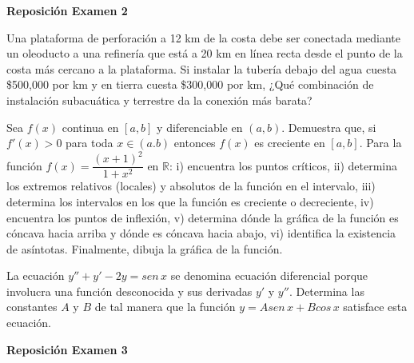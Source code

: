 \documentclass[12pt]{exam}
\begin{document}
\newpage

\begin{center}
\Large 
\textbf{Reposición Examen 2}
\end{center}{}
\normalsize

\begin{questions}
    \question Una plataforma de perforación a 12 km de la costa debe ser conectada mediante un oleoducto a una refinería que está a 20 km en línea recta desde el punto de la costa más cercano a la plataforma. Si instalar la tubería debajo del agua cuesta \$500,000 por km y en tierra cuesta \$300,000 por km, ¿Qué combinación de instalación subacuática y terrestre da la conexión más barata?

\vskip10pt
\question 
Sea $f(x)$ continua en $[a,b]$ y diferenciable en $(a,b)$. Demuestra que, si $f'(x)>0$ para toda $x\in (a.b)$ entonces $f(x)$ es creciente en $[a,b]$.
\vskip10pt
\question Para la función $f(x)=\dfrac{(x+1)^2}{1+x^2}$ en $\mathbb{R}$: i) encuentra los puntos críticos, ii) determina los extremos relativos (locales) y absolutos de la función en el intervalo, iii) determina los intervalos en los que la función es creciente o decreciente, iv) encuentra los puntos de inflexión, v) determina dónde la gráfica de la función es cóncava hacia arriba y dónde es cóncava hacia abajo, vi) identifica la existencia de asíntotas. Finalmente, dibuja la gráfica de la función.

\question La ecuación $y''+y'-2y=sen\,x$ se denomina ecuación diferencial porque involucra una función desconocida y sus derivadas $y'$ y $y''$. Determina las constantes $A$ y $B$ de tal manera que la función $y=Asen\,x+Bcos\,x$ satisface esta ecuación.

    \end{questions}



\newpage

\begin{center}
\Large 
\textbf{Reposición Examen 3}
\end{center}{}
\normalsize
\end{document}
